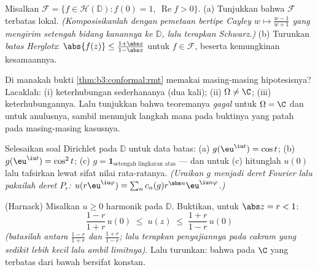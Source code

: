 \begin{exercise}[$\star\star$]\label{exo:b3:conformal:6}
Misalkan $\mathcal F = \{f \in \mathcal H(\mathbb D) : f(0) = 1,\
\operatorname{Re}f > 0\}$.
(a) Tunjukkan bahwa $\mathcal F$ terbatas lokal.
\emph{(Komposisikanlah dengan pemetaan bertipe Cayley $w \mapsto \frac{w -
1}{w + 1}$ yang mengirim setengah bidang kanannya ke $\mathbb D$, lalu
terapkan Schwarz.)}
(b) Turunkan \emph{batas Herglotz}: $\abs{f(z)} \leq
\frac{1 + \abs z}{1 - \abs z}$ untuk $f \in \mathcal F$, beserta
kemungkinan kesamaannya.
\end{exercise}

\begin{exercise}[$\star\star\star$]\label{exo:b3:conformal:7}
Di manakah bukti \cref{thm:b3:conformal:rmt} memakai masing-masing
hipotesisnya? Lacaklah: (i) keterhubungan sederhananya (dua kali); (ii)
$\Omega \neq \C$; (iii) keterhubungannya. Lalu tunjukkan bahwa
teoremanya \emph{gagal} untuk $\Omega = \C$ dan untuk anulusnya,
sambil menunjuk langkah mana pada buktinya yang patah pada masing-masing kasusnya.
\end{exercise}

\begin{exercise}[$\star\star$]\label{exo:b3:conformal:8}
Selesaikan soal Dirichlet pada $\mathbb D$ untuk data
batas: (a) $g(\eu^{\iu t}) = \cos t$; (b) $g(\eu^{\iu t}) =
\cos^2 t$; (c) $g = \mathbf 1_{\text{setengah lingkaran atas}}$ ---
dan untuk (c) hitunglah $u(0)$ lalu tafsirkan lewat sifat nilai
rata-ratanya. \emph{(Uraikan $g$ menjadi deret Fourier lalu pakailah
deret $P_r$: $u(r\eu^{\iu\varphi}) = \sum_n c_n(g)
r^{\abs n}\eu^{\iu n\varphi}$.)}
\end{exercise}

\begin{exercise}[$\star\star\star$]\label{exo:b3:conformal:9}
(Harnack) Misalkan $u \geq 0$ harmonik pada $\mathbb D$. Buktikan,
untuk $\abs z = r < 1$:
\[
\frac{1 - r}{1 + r}\,u(0) \;\leq\; u(z) \;\leq\;
\frac{1 + r}{1 - r}\,u(0)
\]
\emph{(batasilah  antara $\frac{1-r}{1+r}$ dan
$\frac{1+r}{1-r}$; lalu terapkan penyajiannya pada cakram yang sedikit
lebih kecil lalu ambil limitnya)}. Lalu turunkan: bahwa 
pada $\C$ yang terbatas dari bawah bersifat konstan.
\end{exercise}

